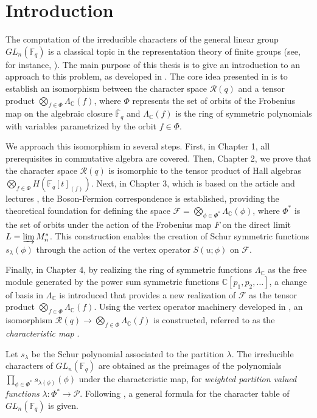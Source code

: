 \section*{Introduction}


The computation of the irreducible characters of the general linear group $GL_n(\mathbb{F}_q)$ is a classical topic in the representation theory of finite groups (see, for instance, \cite{green1955characters}). The main purpose of this thesis is to give an introduction to an approach to this problem, as developed in \cite{jing2024characters}. The core idea presented in \cite{jing2024characters} is to establish an isomorphism between the character space $ \mathcal{R}(q) $ and a tensor product $\bigotimes_{f \in \Phi} \Lambda_{\mathbb{C}}(f)$, where $\Phi $ represents the set of orbits of the Frobenius map on the algebraic closure $\overline{\mathbb{F}}_q$ and $\Lambda_{\mathbb{C}}(f)$ is the ring of symmetric polynomials with variables parametrized by the orbit $f\in\Phi$.

We approach this isomorphism in several steps. First, in Chapter 1, all prerequisites in commutative algebra are covered. Then, Chapter 2, we prove that the character space $ \mathcal{R}(q) $ is isomorphic to the tensor product of Hall algebras $ \bigotimes_{f \in \Phi} H(\mathbb{F}_q[t]_{(f)})$. Next, in Chapter 3, which is based on the article \cite{de2006finite} and lectures \cite{kac2013bombay}, the Boson-Fermion correspondence is established, providing the theoretical foundation for defining the space $ \mathcal{F} = \bigotimes_{\phi \in \Phi^*} \Lambda_{\mathbb{C}}(\phi)$, where $\Phi^*$ is the set of orbits under the action of the Frobenius map $F$ on the direct limit $L = \varinjlim M_n^*$. This construction enables the creation of Schur symmetric functions $s_\lambda(\phi)$ through the action of the vertex operator $S(u; \phi)$ on $\mathcal{F}$.

Finally, in Chapter 4, by realizing the ring of symmetric functions $\Lambda_{\mathbb{C}}$ as the free module generated by the power sum symmetric functions $\mathbb{C}[p_1,p_2,\dots]$, a change of basis in $\Lambda_{\mathbb{C}}$ is introduced that provides a new realization of $\mathcal{F}$ as the tensor product $ \bigotimes_{f \in \Phi} \Lambda_{\mathbb{C}}(f) $. Using the vertex operator machinery developed in \cite{jing2024characters}, an isomorphism $\mathcal{R}(q) \rightarrow \bigotimes_{f \in \Phi} \Lambda_{\mathbb{C}}(f)$ is constructed, referred to as the \textit{characteristic map} \cite{jing2024characters}. 

Let $s_\lambda$ be the Schur polynomial associated to the partition $\lambda$. The irreducible characters of $GL_n(\mathbb{F}_q)$ are obtained as the preimages of the polynomials $\prod_{\phi \in \Phi^*} s_{\lambda(\phi)}(\phi)$ under the characteristic map, for \textit{weighted partition valued functions} $\lambda:\Phi^*\rightarrow\mathcal{P}$. Following \cite{jing2024characters}, a general formula for the character table of $GL_n(\mathbb{F}_q)$ is given.


